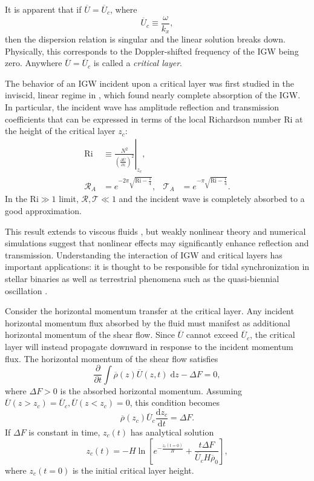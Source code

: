 \documentclass[
        fleqn,
        usenatbib,
    ]{mnras}
\newcommand*{\rd}[2]{\frac{\mathrm{d}#1}{\mathrm{d}#2}}
\newcommand*{\pd}[2]{\frac{\partial#1}{\partial#2}}
\newcommand*{\at}[1]{\left.#1\right|}
\newcommand*{\p}[1]{\left(#1\right)}
\newcommand*{\s}[1]{\left[#1\right]}
\begin{document}
It is apparent that if $\overline{U} = \overline{U}_c$, where
\begin{equation}
    \overline{U}_c \equiv \frac{\omega}{k_x},
\end{equation}
then the dispersion relation is singular and the linear solution breaks down.
Physically, this corresponds to the Doppler-shifted frequency of the IGW being
zero. Anywhere $\overline{U} = \overline{U}_c$ is called a \emph{critical
layer}.

The behavior of an IGW incident upon a critical layer was first studied in the
inviscid, linear regime in \citealp{booker_bretherton}, which found nearly
complete absorption of the IGW\@. In particular, the incident wave has amplitude
reflection and transmission coefficients that can be expressed in terms of the
local Richardson number Ri at the height of the critical layer $z_c$:
\begin{align}
    \mathrm{Ri} &\equiv \at{\frac{N^2}{\p{\pd{\overline{U}}{z}}^2}}_{z_c},
        \label{eq:ri_def}\\
    \mathcal{R}_A &= e^{-2\pi \sqrt{\mathrm{Ri} - \frac{1}{4}}}, &
    \mathcal{T}_A &= e^{-\pi \sqrt{\mathrm{Ri} - \frac{1}{4}}}.
        \label{eq:crit_coeffs}
\end{align}
In the $\mathrm{Ri} \gg 1$ limit, $\mathcal{R}, \mathcal{T} \ll 1$
and the incident wave is completely absorbed to a good approximation.

This result extends to viscous fluids \citep{hazel}, but weakly nonlinear theory
\citep{brown_stewartson} and numerical simulations \citep{winters1994} suggest
that nonlinear effects may significantly enhance reflection and transmission.
Understanding the interaction of IGW and critical layers has important
applications: it is thought to be responsible for tidal synchronization in
stellar binaries \citep{zahn75,gn89} as well as terrestrial phenomena such as
the quasi-biennial oscillation \citep{lindzen_qbo}.

Consider the horizontal momentum transfer at the critical layer. Any incident
horizontal momentum flux absorbed by the fluid must manifest as additional
horizontal momentum of the shear flow. Since $\overline{U}$ cannot exceed
$\overline{U}_c$, the critical layer will instead propagate downward in response
to the incident momentum flux. The horizontal momentum of the shear flow
satisfies
\begin{equation}
    \pd{}{t}\int\limits \overline{\rho}(z) \overline{U}(z, t)\;\mathrm{d}z
        - \Delta F = 0,
\end{equation}
where $\Delta F > 0$ is the absorbed horizontal momentum. Assuming
$\overline{U}(z > z_c) = \overline{U}_c, \overline{U}(z < z_c) = 0$, this
condition becomes
\begin{equation}
    \overline{\rho}(z_c) \overline{U}_c\rd{z_c}{t} = \Delta F.\label{eq:zc_anal}
\end{equation}
If $\Delta F$ is constant in time, $z_c(t)$ has analytical solution
\begin{equation}
    z_c(t) = -H\ln \s{e^{-\frac{z_c(t = 0)}{H}} +
        \frac{t\Delta F}{\overline{U}_c H\overline{\rho}_0}},\label{eq:zc_sol}
\end{equation}
where $z_c(t = 0)$ is the initial critical layer height.
\end{document}

